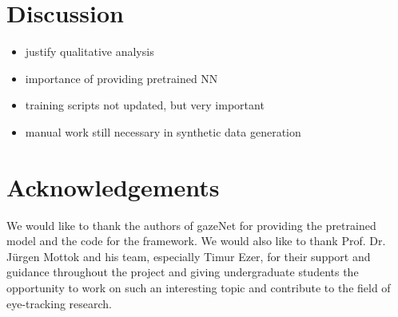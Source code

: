 \documentclass[acmlarge]{acmart}
\begin{document}
\section{Discussion}
\begin{itemize}
    \item justify qualitative analysis
    \item importance of providing pretrained NN
    \item training scripts not updated, but very important
    \item manual work still necessary in synthetic data generation
\end{itemize}

\section{Acknowledgements}
We would like to thank the authors of gazeNet for providing the pretrained model and the code for the framework. We would also like to thank Prof. Dr. Jürgen Mottok and his team, especially Timur Ezer, for their support and guidance throughout the project and giving undergraduate students the opportunity to work on such an interesting topic and contribute to the field of eye-tracking research.



\end{document}
